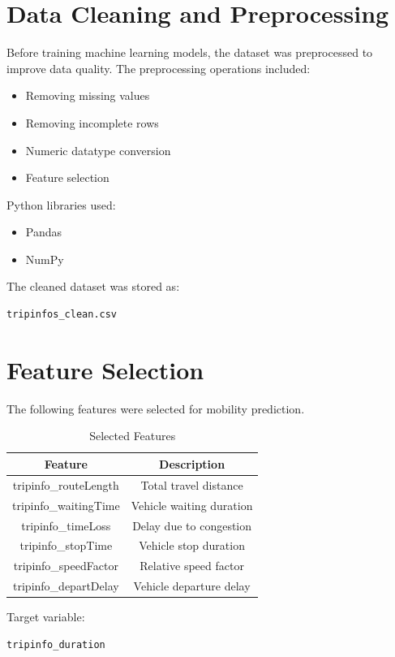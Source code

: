 \documentclass[12pt,a4paper]{report}
\begin{document}
\section{Data Cleaning and Preprocessing}
Before training machine learning models, the dataset was preprocessed to improve data quality.
The preprocessing operations included:
\begin{itemize}
    \item Removing missing values
    \item Removing incomplete rows
    \item Numeric datatype conversion
    \item Feature selection
\end{itemize}
Python libraries used:
\begin{itemize}
    \item Pandas
    \item NumPy
\end{itemize}
The cleaned dataset was stored as:
\begin{verbatim}
tripinfos_clean.csv
\end{verbatim}

\section{Feature Selection}
The following features were selected for mobility prediction.
\begin{table}[H]
\centering
\begin{tabular}{|c|c|}
\hline
\textbf{Feature} & \textbf{Description} \\
\hline
tripinfo\_routeLength & Total travel distance \\
tripinfo\_waitingTime & Vehicle waiting duration \\
tripinfo\_timeLoss & Delay due to congestion \\
tripinfo\_stopTime & Vehicle stop duration \\
tripinfo\_speedFactor & Relative speed factor \\
tripinfo\_departDelay & Vehicle departure delay \\
\hline
\end{tabular}
\caption{Selected Features}
\end{table}
Target variable:
\begin{verbatim}
tripinfo_duration
\end{verbatim}
\end{document}
